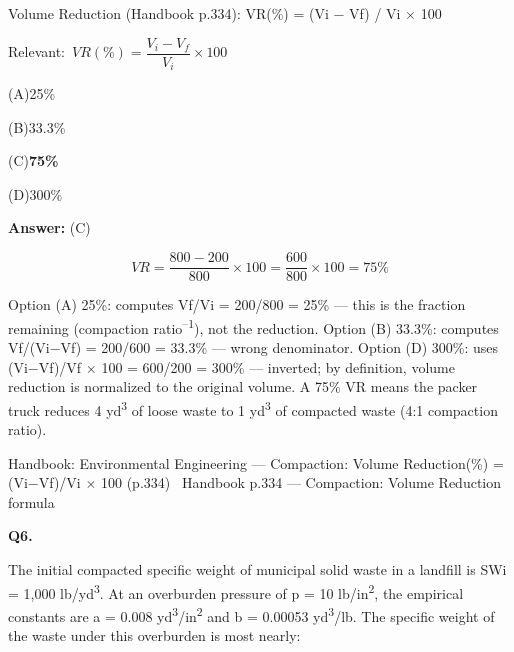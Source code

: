 \documentclass[11pt]{article}
\newcommand{\correct}[1]{\textbf{#1}\;{\color{accent}$\checkmark$}}
\newcommand{\optline}[2]{\par\noindent\hspace{1.2em}(#1)\hspace{0.6em}#2}
\begin{document}
Volume Reduction (Handbook p.334):
VR(\%) = (Vi $-$ Vf) / Vi $\times$ 100\par\vspace{3pt}
{\small\color{soft}Relevant:}\ $VR(\%) = \dfrac{V_i - V_f}{V_i} \times 100$\par\vspace{3pt}
\optline{A}{25\%}
\optline{B}{33.3\%}
\optline{C}{\correct{75\%}}
\optline{D}{300\%}
\par\vspace{3pt}
\vspace{2pt}\par\noindent\colorbox{boxbg}{\parbox{\dimexpr\linewidth-2\fboxsep\relax}{%
\vspace{2pt}\textbf{Answer:} (C)\par\vspace{2pt}
{\small \[VR = \frac{800 - 200}{800} \times 100 = \frac{600}{800} \times 100 = 75\%\]

Option (A) 25\%: computes Vf/Vi = 200/800 = 25\% --- this is the fraction remaining (compaction ratio\textsuperscript{--}\textsuperscript{1}), not the reduction. Option (B) 33.3\%: computes Vf/(Vi$-$Vf) = 200/600 = 33.3\% --- wrong denominator. Option (D) 300\%: uses (Vi$-$Vf)/Vf $\times$ 100 = 600/200 = 300\% --- inverted; by definition, volume reduction is normalized to the original volume. A 75\% VR means the packer truck reduces 4 yd\textsuperscript{3} of loose waste to 1 yd\textsuperscript{3} of compacted waste (4:1 compaction ratio).}\par\vspace{2pt}
{\footnotesize\color{soft}Handbook: Environmental Engineering --- Compaction: Volume Reduction(\%) = (Vi$-$Vf)/Vi $\times$ 100 (p.334) \textbullet\ Handbook p.334 --- Compaction: Volume Reduction formula}\vspace{2pt}
}}
\vspace{9pt}
\filbreak
\textbf{\color{accent}Q6.}\par\vspace{2pt}
The initial compacted specific weight of municipal solid waste in a landfill is SWi = 1,000 lb/yd\textsuperscript{3}. At an overburden pressure of p = 10 lb/in\textsuperscript{2}, the empirical constants are a = 0.008 yd\textsuperscript{3}/in\textsuperscript{2} and b = 0.00053 yd\textsuperscript{3}/lb. The specific weight of the waste under this overburden is most nearly:
\end{document}
